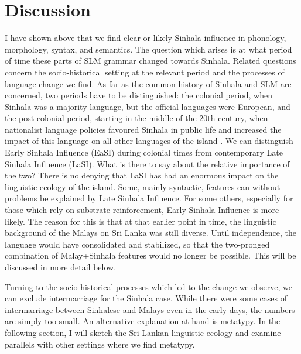 \documentclass[a4paper,10pt]{article}
\begin{document}
\section{Discussion}
I have shown above that we find clear or likely Sinhala influence in phonology, morphology, syntax, and semantics. The question which arises is at what period of time these parts of SLM grammar changed towards Sinhala. Related questions concern the socio-historical setting at the relevant period and the processes of language change we find. As far as the common history of Sinhala and SLM are concerned, two periods have to be distinguished: the colonial period, when Sinhala was a majority language, but the official languages were European, and the post-colonial period, starting in the middle of the 20th century, when nationalist language policies favoured Sinhala in public life and increased the impact of this language on all other languages of the island \citep{NissanEtAl1990,Saldin2003}. We can distinguish Early Sinhala Influence (EaSI) during colonial times from contemporary Late Sinhala Influence (LaSI). What is there to say about the relative importance of the two? There is no denying that LaSI has had an enormous impact on the linguistic ecology of the island. Some, mainly syntactic, features can without problems be explained by Late Sinhala Influence. For some others, especially for those which rely on substrate reinforcement, Early Sinhala Influence is more likely. The reason for this is that at that earlier point in time, the linguistic background of the Malays on Sri Lanka was still diverse. Until independence, the language would have consolidated and stabilized, so that the two-pronged combination of Malay+Sinhala features would no longer be possible. This will be discussed in more detail below.


Turning to the socio-historical processes which led to the change we observe, we can exclude intermarriage for the Sinhala case. While there were some cases of intermarriage between Sinhalese and Malays even in the early days, the numbers are simply too small. An alternative explanation at hand is metatypy. In the following section, I will sketch the Sri Lankan linguistic ecology and examine parallels with other settings where we find metatypy.
 
\end{document}
